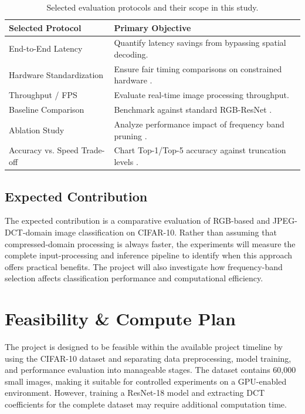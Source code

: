 \documentclass[11pt]{article}
\begin{document}
\begin{table}[H]
    \centering
    \caption{Selected evaluation protocols and their scope in this study.}
    \label{tab:selected_protocols}
    \begin{tabular}{lp{8cm}}
        \toprule
        \textbf{Selected Protocol} & \textbf{Primary Objective} \\
        \midrule
        End-to-End Latency & Quantify latency savings from bypassing spatial decoding. \\
        Hardware Standardization & Ensure fair timing comparisons on constrained hardware \citep{canziani2016analysis}. \\
        Throughput / FPS & Evaluate real-time image processing throughput. \\
        Baseline Comparison & Benchmark against standard RGB-ResNet \citep{gueguen2018faster}. \\
        Ablation Study & Analyze performance impact of frequency band pruning \citep{meyes2019ablation}. \\
        Accuracy vs. Speed Trade-off & Chart Top-1/Top-5 accuracy against truncation levels \citep{gueguen2018faster}. \\
        \bottomrule
    \end{tabular}
\end{table}

\subsection{Expected Contribution}

The expected contribution is a comparative evaluation of RGB-based and
JPEG-DCT-domain image classification on CIFAR-10. Rather than assuming that
compressed-domain processing is always faster, the experiments will measure
the complete input-processing and inference pipeline to identify when this
approach offers practical benefits. The project will also investigate how
frequency-band selection affects classification performance and computational
efficiency.

\section{Feasibility \& Compute Plan}
\label{sec:feasibility}

The project is designed to be feasible within the available project timeline
by using the CIFAR-10 dataset and separating data preprocessing, model
training, and performance evaluation into manageable stages. The dataset
contains 60,000 small images, making it suitable for controlled experiments
on a GPU-enabled environment. However, training a ResNet-18 model and
extracting DCT coefficients for the complete dataset may require additional
computation time.
\end{document}
